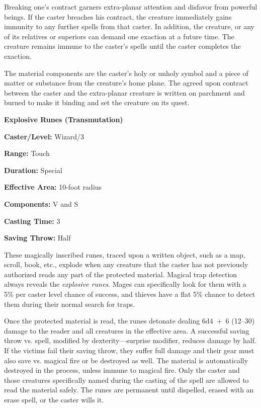 \begin{multicols}{2}
Breaking one's contract garners extra-planar attention and disfavor from powerful beings.  If the caster breaches his contract, the creature immediately gains immunity to any further spells from that caster.  In addition, the creature, or any of its relatives or superiors can demand one exaction at a future time.  The creature remains immune to the caster's spells until the caster completes the exaction.

The material components are the caster's holy or unholy symbol and a piece of matter or substance from the creature's home plane.  The agreed upon contract between the caster and the extra-planar creature is written on parchment and burned to make it binding and set the creature on its quest.

\vspace{1em}

\noindent
\begin{minipage}{\columnwidth}

\noindent \textbf{Explosive Runes (Transmutation)}

\noindent \textbf{Caster/Level:} Wizard/3

\noindent \textbf{Range:} Touch

\noindent \textbf{Duration:} Special

\noindent \textbf{Effective Area:} 10-foot radius

\noindent \textbf{Components:} V and S

\noindent \textbf{Casting Time:} 3

\noindent \textbf{Saving Throw:} Half

\end{minipage}

These magically inscribed runes, traced upon a written object, such as a map, scroll, book, etc., explode when any creature that the caster has not previously authorized reads any part of the protected material.  Magical trap detection always reveals the \textit{explosive runes}.  Mages can specifically look for them with a 5\% per caster level chance of success, and thieves have a flat 5\% chance to detect them during their normal search for traps.

Once the protected material is read, the runes detonate dealing 6d4~+~6 (12--30) damage to the reader and all creatures in the effective area.  A successful saving throw vs. spell, modified by dexterity---surprise modifier, reduces damage by half.  If the victims fail their saving throw, they suffer full damage and their gear must also save vs. magical fire or be destroyed as well.  The material is automatically destroyed in the process, unless immune to magical fire.  Only the caster and those creatures specifically named during the casting of the spell are allowed to read the material safely.  The runes are permanent until dispelled, erased with an erase spell, or the caster wills it.  


\end{multicols}
